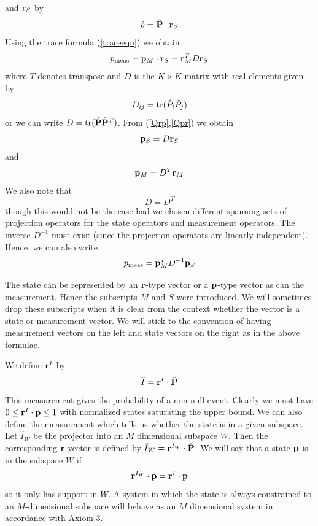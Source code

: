 \documentclass[12pt]{article}
\begin{document}
and ${\bf r}_S$ by
\begin{equation}\label{rhoPr}
\hat{\rho}=\hat{\bf P}\cdot {\bf r}_S
\end{equation}
Using the trace formula (\ref{traceeqn}) we obtain
\begin{equation}\label{Qpr}
p_{\rm meas}= {\bf p}_M\cdot{\bf r}_S={\bf r}^T_M D {\bf r}_S
\end{equation}
where $T$ denotes transpose and $D$ is the $K\times K$ matrix with
real elements given by
\begin{equation}\label{QDij}
D_{ij}={\rm tr}(\hat{P}_i\hat{P}_j)
\end{equation}
or we can write $D={\rm tr}(\hat{\bf P}\hat{\bf P}^T)$.
From (\ref{Qrp},\ref{Qpr}) we obtain
\begin{equation}\label{QpDr}
{\bf p}_S=D{\bf r}_S
\end{equation}
and
\begin{equation}
{\bf p}_M=D^T {\bf r}_M
\end{equation}
We also note that
\begin{equation}
D=D^T
\end{equation}
though this would not be the case  had we chosen different spanning sets
of projection operators for the state operators and measurement operators.
The inverse $D^{-1}$ must exist (since the projection operators are
linearly independent).  Hence, we can also write
\begin{equation}
p_{\rm meas}= {\bf p}_M^T D^{-1} {\bf p}_S
\end{equation}

The state can be represented by an ${\bf r}$-type vector or a
${\bf p}$-type vector
as can the measurement.  Hence the subscripts $M$ and $S$ were
introduced.  We will sometimes drop these subscripts when it is clear
from the context whether the vector is a state or measurement vector.
We will stick to the convention of having measurement vectors on the
left and state vectors on the right as in the above formulae.

We define ${\bf r}^I$ by
\begin{equation}
\hat{I}={\bf r}^I\cdot\hat{\bf P}
\end{equation}
This measurement gives the probability of a non-null event. Clearly we
must have $0\leq {\bf r}^I\cdot{\bf p} \leq 1$ with normalized states
saturating the upper bound.
We can also define the measurement which tells us whether the state is
in a given subspace.  Let $\hat{I}_W$ be the projector into an $M$
dimensional subspace $W$.  Then the corresponding ${\bf r}$ vector is
defined by $\hat{I}_W={\bf r}^{I_W}\cdot\hat{\bf P}$.  We will
say that a state $\bf p$ is in the subspace $W$ if
\begin{equation}
{\bf r}^{I_W}\cdot{\bf p}={\bf r}^I\cdot{\bf p}
\end{equation}
so it only has support in $W$.  A system in which the state is always
constrained to an $M$-dimensional subspace will behave as an $M$
dimensional system in accordance with Axiom 3.
\end{document}
